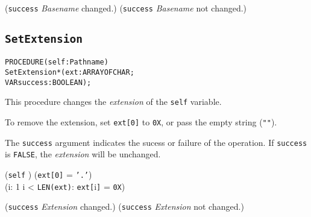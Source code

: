 \begin{postcondition}
  (\texttt{success} \implies \textrm{\emph{Basename} changed.}) \logicalor
  (\logicalnot \texttt{success} \implies \textrm{\emph{Basename} not changed.})
\end{postcondition}


\subsection{\texttt{SetExtension}}\label{pathnames:setextension}
\begin{alltt}
  PROCEDURE (self : Pathname)
            SetExtension*(ext         : ARRAY OF CHAR;
                          VAR success : BOOLEAN);
\end{alltt}

\begin{semantics}
  This procedure changes the \emph{extension} of the \texttt{self} variable.

  To remove the extension, set \texttt{ext[0]} to \texttt{0X}, or pass
  the empty string (\texttt{""}).

  The \texttt{success} argument indicates the sucess or failure of the
  operation.  If \texttt{success} is \texttt{FALSE}, the \emph{extension}
  will be unchanged.
\end{semantics}

\begin{precondition}
(\texttt{self} \neq \nil) \logicaland {}  \logicaland
  (\texttt{ext[0]} = \texttt{'.'}) \logicaland \\
  (\exists i: 1 \leq i < \texttt{LEN(ext)}: \texttt{ext[}i\texttt{]} = \texttt{0X})
\end{precondition}

\begin{postcondition}
  (\texttt{success} \implies \textrm{\emph{Extension} changed.}) \logicalor
  (\logicalnot \texttt{success} \implies \textrm{\emph{Extension} not changed.})
\end{postcondition}
